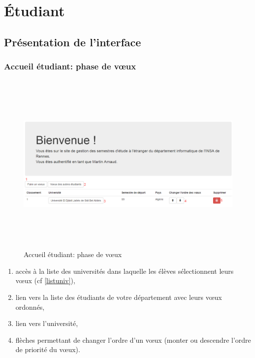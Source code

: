 \chapter{Étudiant}

\section{Présentation de l'interface}

  \subsection{Accueil étudiant: phase de vœux}
   	\label{pv}
   	\begin{figure}[H]
  	\centering
  	
  	\includegraphics[width=16cm,height=9cm]{Images/Etudiant/faire_voeux_etud.png}
  	\caption{Accueil étudiant: phase de vœux}
  \end{figure}
            
    \begin{enumerate}
       	\item accès à la liste des universités dans laquelle les élèves sélectionnent leurs vœux (cf \ref{listuniv}),
       	\item lien vers la liste des étudiants de votre département avec leurs vœux ordonnés,
       	\item lien vers l'université,
       	\item flèches permettant de changer l'ordre d'un vœux (monter ou descendre l'ordre de priorité du vœux).
     \end{enumerate}
     
